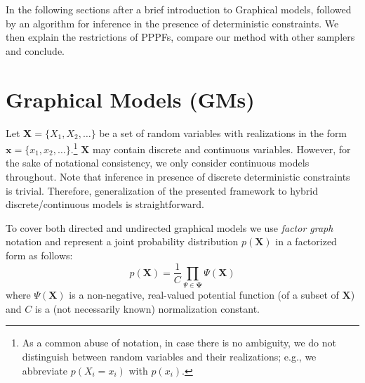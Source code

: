\documentclass[letterpaper]{article}
\renewcommand{\vec}[1]{\mathbf{#1}}
\newcommand{\pr}{p}
\begin{document}
In the following sections after a brief introduction to Graphical models, 
followed by an algorithm for inference in the presence of deterministic constraints.
We then explain the restrictions of PPPFs, compare our method with other samplers and conclude. 

\section{Graphical Models (GMs)}
Let $\vec{X} = \{X_1, X_2, \ldots\}$ be a set of random variables with realizations in the form 
$\vec{x} = \{x_1, x_2, \ldots\}$.\footnote{
As a common abuse of notation, in case there is no ambiguity, we do not distinguish between random variables and their realizations; e.g., we abbreviate $\pr(X_i = x_i)$ with $\pr(x_i)$.}
$\vec{X}$ may contain discrete and continuous variables. 
However, for the sake of notational consistency, %
we only consider continuous models throughout. 
Note that inference in presence of discrete deterministic constraints is trivial.
Therefore, generalization of the presented framework to hybrid discrete/continuous models is straightforward.   

To cover both directed and undirected graphical models we use
\emph{factor graph} notation \cite{kschischang2001factor}
and represent a joint probability distribution $\pr(\vec{X})$ in a factorized form as follows: 
\begin{equation}
\label{e:factor-graph}
\pr(\vec{X}) = \frac{1}{C} \prod_{\Psi \in \boldsymbol\Psi} \Psi (\vec{X})
\end{equation}
where 
$\Psi(\vec{X})$ is a non-negative, real-valued potential function (of a subset of $\vec{X}$) and $C$ is a (not necessarily known) normalization constant.
\end{document}
